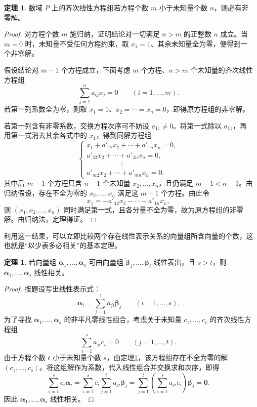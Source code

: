 \documentclass[UTF8, fontset=fandol, a4paper, 12pt]{ctexart}
\newcommand{\va}{\boldsymbol\alpha}
\newcommand{\vb}{\boldsymbol\beta}
\newcommand{\vo}{\boldsymbol0}
\theoremstyle{definition}
\newtheorem{theorem}[definition]{定理}
\begin{document}
\begin{theorem}\label{th:homogeneous}
数域 $P$ 上的齐次线性方程组若方程个数 $m$ 小于未知量个数 $n$，则必有非零解。
\end{theorem}
\begin{proof}
对方程个数 $m$ 施归纳，证明结论对一切满足 $n>m$ 的正整数 $n$ 成立。当 $m=0$ 时，未知量不受任何方程约束，取 $x_1=1$、其余未知量全为零，便得到一个非零解。

假设结论对 $m-1$ 个方程成立，下面考虑 $m$ 个方程、$n>m$ 个未知量的齐次线性方程组
\[
 \sum_{j=1}^{n}a_{ij}x_j=0\qquad(i=1,\ldots,m).
\]
若第一列系数全为零，则取 $x_1=1$、$x_2=\cdots=x_n=0$，即得原方程组的非零解。

若第一列含有非零系数，交换方程次序可不妨设 $a_{11}\ne0$。将第一式除以 $a_{11}$，再用第一式消去其余各式中的 $x_1$，得到同解方程组
\[
 \begin{cases}
 x_1+a'_{12}x_2+\cdots+a'_{1n}x_n=0,\\
 a'_{22}x_2+\cdots+a'_{2n}x_n=0,\\
 \hspace{5em}\vdots\\
 a'_{m2}x_2+\cdots+a'_{mn}x_n=0.
 \end{cases}
\]
其中后 $m-1$ 个方程只含 $n-1$ 个未知量 $x_2,\ldots,x_n$，且仍满足 $m-1<n-1$。由归纳假设，存在不全为零的 $x_2,\ldots,x_n$ 满足这 $m-1$ 个方程。由此令
\[
 x_1=-a'_{12}x_2-\cdots-a'_{1n}x_n,
\]
则 $(x_1,x_2,\ldots,x_n)$ 同时满足第一式，且各分量不全为零，故为原方程组的非零解。由归纳法，定理得证。
\end{proof}

利用这一结果，可以立即比较两个存在线性表示关系的向量组所含向量的个数，这也就是“以少表多必相关”的基本定理。

\begin{theorem}\label{th:count}
若向量组 $\va_1,\ldots,\va_s$ 可由向量组 $\vb_1,\ldots,\vb_t$ 线性表出，且 $s>t$，则 $\va_1,\ldots,\va_s$ 线性相关。
\end{theorem}
\begin{proof}
按题设写出线性表示式：
\[
 \va_i=\sum_{j=1}^{t}a_{ji}\vb_j\qquad(i=1,\ldots,s).
\]
为了寻找 $\va_1,\ldots,\va_s$ 的非平凡零线性组合，考虑关于未知量 $c_1,\ldots,c_s$ 的齐次线性方程组
\[
 \sum_{i=1}^{s}a_{ji}c_i=0\qquad(j=1,\ldots,t).
\]
由于方程个数 $t$ 小于未知量个数 $s$，由定理\ref{th:homogeneous}，该方程组存在不全为零的解 $(c_1,\ldots,c_s)$。将这组解作为系数，代入线性组合并交换求和次序，即得
\[
 \sum_{i=1}^{s}c_i\va_i
 =\sum_{i=1}^{s}c_i\sum_{j=1}^{t}a_{ji}\vb_j
 =\sum_{j=1}^{t}\left(\sum_{i=1}^{s}a_{ji}c_i\right)\vb_j=\vo.
\]
因此 $\va_1,\ldots,\va_s$ 线性相关。
\end{proof}
\end{document}
